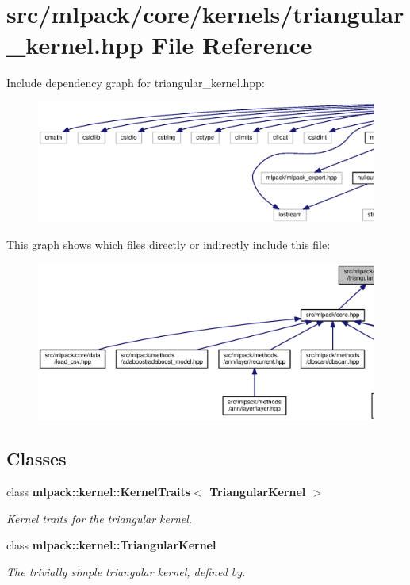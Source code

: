 \section{src/mlpack/core/kernels/triangular\+\_\+kernel.hpp File Reference}
\label{triangular__kernel_8hpp}
Include dependency graph for triangular\+\_\+kernel.\+hpp\+:
\nopagebreak
\begin{figure}[H]
\begin{center}
\leavevmode
\includegraphics[width=350pt]{triangular__kernel_8hpp__incl}
\end{center}
\end{figure}
This graph shows which files directly or indirectly include this file\+:
\nopagebreak
\begin{figure}[H]
\begin{center}
\leavevmode
\includegraphics[width=350pt]{triangular__kernel_8hpp__dep__incl}
\end{center}
\end{figure}
\subsection*{Classes}
\begin{DoxyCompactItemize}
\item 
class {\bf mlpack\+::kernel\+::\+Kernel\+Traits$<$ Triangular\+Kernel $>$}
\begin{DoxyCompactList}\small\item\em Kernel traits for the triangular kernel. \end{DoxyCompactList}\item 
class {\bf mlpack\+::kernel\+::\+Triangular\+Kernel}
\begin{DoxyCompactList}\small\item\em The trivially simple triangular kernel, defined by. \end{DoxyCompactList}\end{DoxyCompactItemize}
